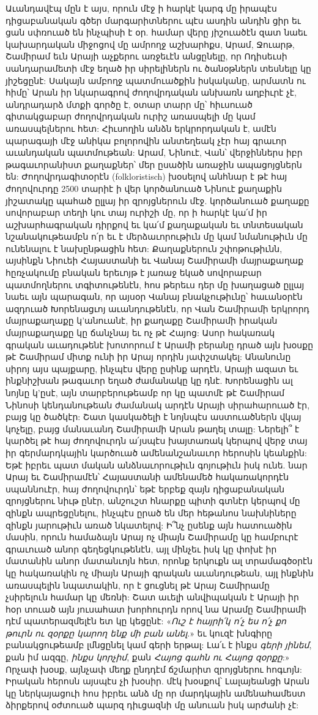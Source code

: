 \documentclass{article}
\begin{document}
{Աւանդավէպ մըն է այս, որուն մէջ ի հարկէ կարգ մը իրապէս դիցաբանական գծեր մարգարիտներու պէս ասդին անդին ցիր եւ ցան սփռուած են ինչպիսի է օր. համար վերը յիշուածէն զատ նաեւ կախարդական միջոցով մը ամրողջ աշխարհքս, Արամ, Ջուարթ, Շամիրամ եւն Արայի աչքերու առջեւէն անցընելը, որ Ոդիսեւսի սանդարամետի մէջ եղած իր սիրելիներն ու ծանօթներն տեսնելը կը յիշեցընէ: Սակայն ամբողջ պատմուածքին իսկականը, արմատն ու հիմը՝ Արան իր նկարագրով ժողովրդական անխառն աղբիւրէ չէ, անդրադարձ մտքի գործը է, օտար տարր մը՝ հիւսուած գիտակցաբար ժողովրդական ուրիշ առասպելի մը կամ առասպելներու հետ: Հիւսողին անձն երկրորդական է, ամէն պարագայի մէջ անիկա բոլորովին անտեղեակ չէր հայ գրաւոր աւանդական պատմութեան: Արամ, Նինուէ, Վան՝ վերջիններս իբր թագաւորանիստ քաղաքներ՝ մեր ըսածին առաջին ապացոյցներն են: Ժողովրդագիտօրէն (folkloristisch) խօսելով անհնար է թէ հայ ժողովուրդը 2500 տարիէ ի վեր կործանուած Նինուէ քաղաքին յիշատակը պահած ըլլայ իր զրոյցներուն մէջ. կործանուած քաղաքը սովորաբար տեղի կու տայ ուրիշի մը, որ ի հարկէ կա՛մ իր աշխարհագրական դիրքով եւ կա՛մ քաղաքական եւ տնտեսական նշանակութեամբն ո՛ր եւ է մերձաւորութիւն մը կամ նմանութիւն մը ունենալու է նախընթացին հետ: Քաղաքներուն շփոթութիւնն, այսինքն Նիուեի Հայաստանի եւ Վանայ Շամիրամի մայրաքաղաք հըռչակումը բնական երեւոյթ է յառաջ եկած սովորաբար պատմողներու տգիտութենէն, հոս թերեւս դեր մը խաղացած ըլլայ նաեւ այն պարագան, որ այսօր Վանայ բնակչութիւնը՝ հաւանօրէն ազդուած Խորենացւոյ աւանդութենէն, որ Վան Շամիրամի երկրորդ մայրաքաղաքը կ'անուանէ, իր քաղաքը Շամիրամի իրական մայրաքաղաքը կը ճանչնայ եւ ոչ թէ Հայոց: Ասոր հակառակ գրական աւադութենէ խոտորում է Արամի բերանը դրած այն խօսքը թէ Շամիրամ միտք ունի իր Արայ որդին յափշտակել: Անանունը սիրոյ այս պայքարը, ինչպէս վերը ըսինք արդէն, Արայի ազատ եւ ինքնիշխան թագաւոր եղած ժամանակը կը դնէ. Խորենացին ալ նոյնը կ'ըսէ, այն տարբերութեամբ որ կը պատմէ թէ Շամիրամ Նինոսի կենդանութեան ժամանակ արդէն Արայի սիրահարուած էր, բայց կը ծածկէր: Շատ կասկածելի է նոյնպէս աստուածներն վկայ կոչելը, բայց մանաւանդ Շամիրամի Արան թաղել տալը: Ներելի՞ է կարծել թէ հայ ժողովուրդն ա՛յսպէս խայտառակ կերպով վերջ տայ իր գերմարդկային կարծուած ամենանշանաւոր հերոսին կեանքին: Եթէ իբրեւ պատ մական անձնաւորութիւն գոյութիւն իսկ ունե. նար Արայ եւ Շամիրամէն՝ Հայաստանի ամենամեծ հակառակորդէն սպաննուէր, հայ ժողովուրդն՝ եթէ երբեք զայն դիցաբանական զրոյցներու նիւթ ընէր, անշուշտ հնարքը պիտի գտնէր կերպով մը զինքն ապրեցընելու, ինչպէս ըրած են մեր հեթանոս նախնիները զինքն յարութիւն առած նկատելով: Ի՞նչ ըսենք այն հատուածին մասին, որուն համաձայն Արայ ոչ միայն Շամիրամը կը համբուրէ գրաւուած անոր գեղեցկութենէն, այլ մինչեւ իսկ կը փոխէ իր մատանին անոր մատանւոյն հետ, որոնք երկուքն ալ տրամագծօրէն կը հակառակին ոչ միայն Արայի գրական աւանդութեան, այլ ինքնին առասպելին նպատակին, որ է ցուցնել թէ Արայ Շամիրամը չսիրելուն համար կը մեռնի: Շատ աւելի անվիպական է Արայի իր հօր տուած այն յուսահատ խորհուրդն որով նա Արամը Շամիրամի դէմ պատերազմելէն ետ կը կեցընէ: «\emph{Ուշ է հայրի՛կ ո՛չ ես ո՛չ քո թուրն ու զօրքը կարող ենք մի բան անել}.» եւ կուզէ խնգիրը բանակցութեամբ լմնցընել կամ գերի երթալ: Լա՛ւ է ինքս \emph{գերի յինեմ}, քան իմ ազգը, \emph{ինքս կորչիմ}, քան \emph{Հայոց գահն ու Հայոց զօրքը}:» Որչափ խօսք, այնչափ մեղք ընդդէմ ճշմարիտ զրոյցներու հոգւոյն: Իրական հերոսն այսպէս չի խօսիր. մէկ խօսքով՝ Լալայեանցի Արան կը ներկայացուի հոս իբրեւ անձ մը որ մարդկային ամենահամեստ ձիրքերով օժտուած պարզ դիւցազնի մը անուան իսկ արժանի չէ:

}
\end{document}
